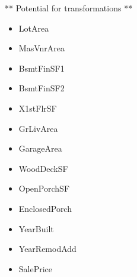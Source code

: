 \documentclass[
]{article}
\providecommand{\tightlist}{%
  \setlength{\itemsep}{0pt}\setlength{\parskip}{0pt}}
\begin{document}
** Potential for transformations **

\begin{itemize}
\tightlist
\item
  LotArea
\item
  MasVnrArea
\item
  BsmtFinSF1
\item
  BsmtFinSF2
\item
  X1stFlrSF
\item
  GrLivArea
\item
  GarageArea
\item
  WoodDeckSF
\item
  OpenPorchSF
\item
  EnclosedPorch
\item
  YearBuilt
\item
  YearRemodAdd
\item
  SalePrice
\end{itemize}
\end{document}
